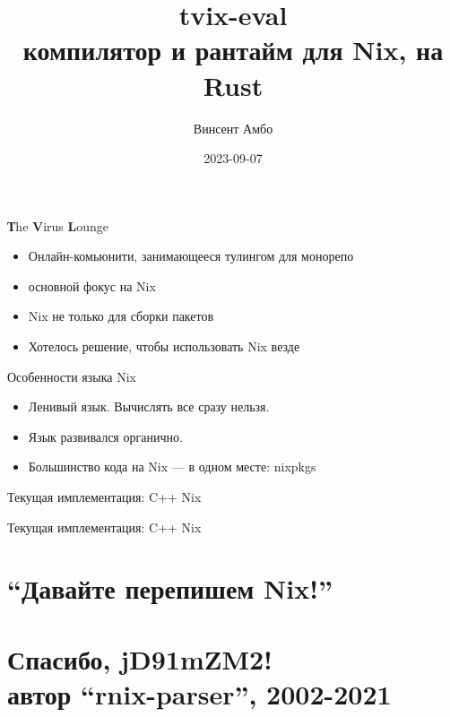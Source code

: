 \documentclass[12pt]{beamer}
\title{tvix-eval \\ компилятор и рантайм для Nix, на Rust}
\date{2023-09-07}
\author{Винсент Амбо}
\institute{TVL}
\newenvironment{code}{\ttfamily}{\par}
\begin{document}
  \begin{frame}
    \begin{center}
      \titlepage
    \end{center}
  \end{frame}

  \begin{frame}{\textbf{Т}he \textbf{V}irus \textbf{L}ounge}
    \begin{itemize}
    \item Онлайн-комьюнити, занимающееся тулингом для монорепо
    \item основной фокус на Nix
    \item Nix не только для сборки пакетов
    \item Хотелось решение, чтобы использовать Nix везде
    \end{itemize}
  \end{frame}

  \begin{frame}{Особенности языка Nix}
    \begin{itemize}
    \item Ленивый язык. Вычислять все сразу нельзя.
    \item Язык развивался органично.
    \item Большинство кода на Nix --- в одном месте: \begin{code}nixpkgs\end{code}
    \end{itemize}
  \end{frame}

  \begin{frame}{Текущая имплементация: C++ Nix}
    
  \end{frame}

  \begin{frame}{Текущая имплементация: C++ Nix}
    
  \end{frame}

  \section{``Давайте перепишем Nix!''}

  \section*{Спасибо, jD91mZM2!\\\normalsize{автор ``rnix-parser'', 2002-2021}}
\end{document}
